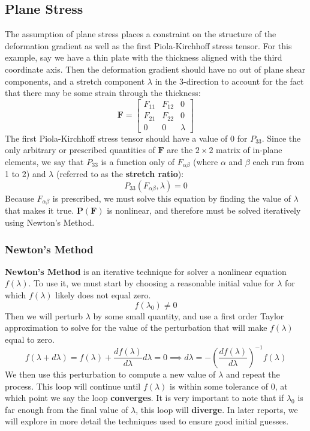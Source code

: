 \documentclass[]{spie}  %
\begin{document}
\subsection{Plane Stress}
The assumption of plane stress places a constraint on the structure of the deformation gradient as well as the first Piola-Kirchhoff stress tensor. For this example, say we have a thin plate with the thickness aligned with the third coordinate axis. Then the deformation gradient should have no out of plane shear components, and a stretch component $\lambda$ in the 3-direction to account for the fact that there may be some strain through the thickness:
\begin{equation}
\bm{F} = 
\begin{bmatrix}
F_{11} 	& F_{12} 	& 0 \\
F_{21} 	& F_{22} 	& 0 \\
0   	& 0			& \lambda	
\end{bmatrix}
\end{equation}
The first Piola-Kirchhoff stress tensor should have a value of 0 for $P_{33}$. Since the only arbitrary or prescribed quantities of $\bm{F}$ are the $2 \times 2$ matrix of in-plane elements, we say that $P_{33}$ is a function only of $F_{\alpha\beta}$ (where $\alpha$ and $\beta$ each run from 1 to 2) and $\lambda$ (referred to as the \textbf{stretch ratio}):
\begin{equation}
P_{33}(F_{\alpha\beta}, \lambda) = 0
\end{equation}  
Because $F_{\alpha\beta}$ is prescribed, we must solve this equation by finding the value of $\lambda$ that makes it true. $\bm{P}(\bm{F})$ is nonlinear, and therefore must be solved iteratively using Newton's Method. 

\subsubsection{Newton's Method}
\textbf{Newton's Method} is an iterative technique for solver a nonlinear equation $f(\lambda)$. To use it, we must start by choosing a reasonable initial value for $\lambda$ for which $f(\lambda)$ likely does not equal zero. 
\begin{equation}
f(\lambda_0) \neq 0
\end{equation}
Then we will perturb $\lambda$ by some small quantity, and use a first order Taylor approximation to solve for the value of the perturbation that will make $f(\lambda)$ equal to zero.
\begin{equation}
\label{eq: dlambda}
f(\lambda + d\lambda) = f(\lambda) + \frac{df(\lambda)}{d\lambda}d\lambda = 0 \implies d\lambda = -\left(\frac{df(\lambda)}{d\lambda}\right)^{-1} f(\lambda)
\end{equation}
We then use this perturbation to compute a new value of $\lambda$ and repeat the process. This loop will continue until $f(\lambda)$ is within some tolerance of 0, at which point we say the loop \textbf{converges}. It is very important to note that if $\lambda_0$ is far enough from the final value of $\lambda$, this loop will \textbf{diverge}. In later reports, we will explore in more detail the techniques used to ensure good initial guesses. 
\end{document}
